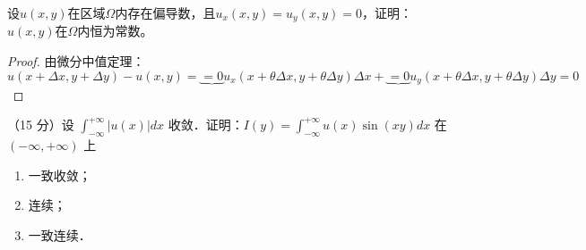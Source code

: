 \begin{exercise}
    设$u(x,y)$在区域$\Omega$内存在偏导数，且$u_x(x,y)=u_y(x,y)=0$，证明：$u(x,y)$在$\Omega$内恒为常数。
\end{exercise}
\begin{proof}
    由微分中值定理：
    \[
        u(x+\Delta x,y+\Delta y)-u(x,y)=\underbrace{=0}{u_x(x+\theta\Delta x,y+\theta\Delta y)}\Delta x+\underbrace{=0}{u_y(x+\theta\Delta x,y+\theta\Delta y)}\Delta y=0
    \]
\end{proof}

\begin{exercise}
    （15 分）设 $\int_{-\infty}^{+\infty}|u(x)| d x$ 收敛．证明：$I(y)=\int_{-\infty}^{+\infty} u(x) \sin (x y) d x$ 在 $(-\infty,+\infty)$ 上
    \begin{enumerate}
        \item 一致收敛；
        \item 连续；
        \item 一致连续．
    \end{enumerate}
\end{exercise}

